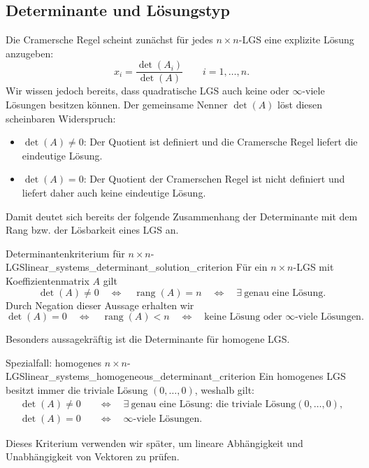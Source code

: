\subsection{Determinante und Lösungstyp}
\label{subsec:linear_systems_determinant_solution_criterion}

Die Cramersche Regel scheint zunächst für jedes $n\times n$-LGS eine explizite
Lösung anzugeben:
\[
  x_i=\frac{\det(A_i)}{\det(A)}
  \qquad i=1,\ldots,n.
\]
Wir wissen jedoch bereits, dass quadratische LGS auch keine oder $\infty$-viele Lösungen
besitzen können. Der gemeinsame Nenner $\det(A)$ löst diesen scheinbaren Widerspruch:

\begin{itemize}
  \item $\det(A)\neq0$: Der Quotient ist definiert und die Cramersche
        Regel liefert die eindeutige Lösung.
  \item $\det(A)=0$: Der Quotient der Cramerschen Regel ist nicht definiert und
        liefert daher auch keine eindeutige Lösung.
\end{itemize}

Damit deutet sich bereits der folgende Zusammenhang der Determinante mit dem Rang
bzw. der Lösbarkeit eines LGS an.
\begin{TheoremBox}{Determinantenkriterium für $n\times n$-LGS}{linear_systems_determinant_solution_criterion}
  Für ein $n\times n$-LGS mit Koeffizientenmatrix $A$ gilt
  \[
    \det(A)\neq0
    \quad\Longleftrightarrow\quad
    \operatorname{rang}(A)=n
    \quad\Longleftrightarrow\quad
    \exists\ \text{genau eine Lösung}.
  \]
  Durch Negation dieser Aussage erhalten wir
  \[
    \det(A)=0
    \quad\Longleftrightarrow\quad
    \operatorname{rang}(A)<n
    \quad\Longleftrightarrow\quad
    \text{keine Lösung oder } \infty\text{-viele Lösungen}.
  \]
\end{TheoremBox}

Besonders aussagekräftig ist die Determinante für homogene LGS.
\begin{KeyPointBox}{Spezialfall: homogenes $n\times n$-LGS}{linear_systems_homogeneous_determinant_criterion}
  Ein homogenes LGS besitzt immer die triviale Lösung $(0,\ldots,0)$, weshalb gilt:
  \[
    \begin{aligned}
      \det(A)\neq0
      &\quad\Longleftrightarrow\quad
      \exists\ \text{genau eine Lösung: die triviale Lösung} (0,\ldots,0),\\[0.8em]
      \det(A)=0
      &\quad\Longleftrightarrow\quad
      \infty\text{-viele Lösungen}.
    \end{aligned}
  \]
\end{KeyPointBox}
Dieses Kriterium verwenden wir später, um lineare Abhängigkeit und Unabhängigkeit von Vektoren zu prüfen.


